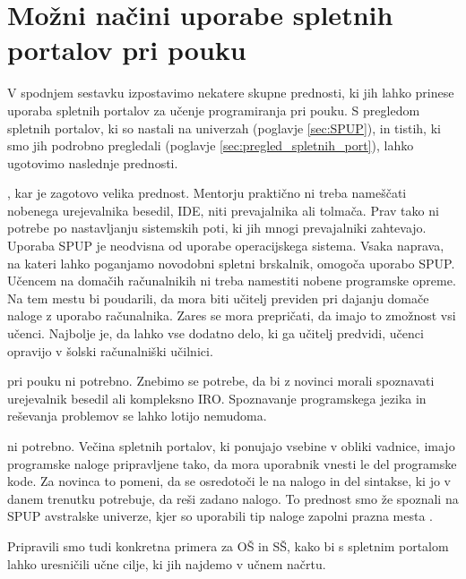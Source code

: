 \section{Možni načini uporabe spletnih portalov pri pouku}
\label{sec:načini_uporabe_sp}

V spodnjem sestavku izpostavimo nekatere skupne prednosti, ki jih
lahko prinese uporaba spletnih portalov za učenje programiranja pri
pouku. S pregledom spletnih portalov, ki so nastali na univerzah
(poglavje \ref{sec:SPUP}), in tistih, ki smo jih podrobno pregledali
(poglavje \ref{sec:pregled_spletnih_port}), lahko ugotovimo naslednje
prednosti.

\begin{description}
\tightlist
\item[Namestitev programske opreme ni potrebna], kar je zagotovo velika
  prednost. Mentorju praktično ni treba nameščati nobenega
  urejevalnika besedil, IDE, niti prevajalnika ali tolmača. Prav tako
  ni potrebe po nastavljanju sistemskih poti, ki jih mnogi
  prevajalniki zahtevajo. Uporaba SPUP je neodvisna od uporabe
  operacijskega sistema. Vsaka naprava, na kateri lahko poganjamo
  novodobni spletni brskalnik, omogoča uporabo SPUP. Učencem na domačih
  računalnikih ni treba namestiti nobene programske opreme. Na
  tem mestu bi poudarili, da mora biti učitelj previden pri dajanju
  domače naloge z uporabo računalnika. Zares se mora prepričati, da imajo to
  zmožnost vsi učenci. Najbolje je, da lahko vse dodatno delo, ki ga
  učitelj predvidi, učenci opravijo v šolski računalniški
  učilnici.
\item[Seznanjanje s programsko opremo] pri pouku ni potrebno. Znebimo
  se potrebe, da bi z novinci morali spoznavati urejevalnik besedil
  ali kompleksno IRO. Spoznavanje programskega jezika in reševanja
  problemov se lahko lotijo nemudoma.
\item[Pisanje progama od začetka do konca] ni potrebno. Večina
  spletnih portalov, ki ponujajo vsebine v obliki vadnice, imajo
  programske naloge pripravljene tako, da mora uporabnik vnesti le del
  programske kode. Za novinca to pomeni, da se osredotoči le na
  nalogo in del sintakse, ki jo v danem trenutku potrebuje, da reši
  zadano nalogo. To prednost smo že spoznali na SPUP avstralske
  univerze, kjer so uporabili tip naloge zapolni prazna mesta
  \cite{thesisAWebP}.
\item
\end{description}

Pripravili smo tudi konkretna primera za OŠ in SŠ, kako bi s spletnim
portalom lahko uresničili učne cilje, ki jih najdemo v učnem načrtu.

